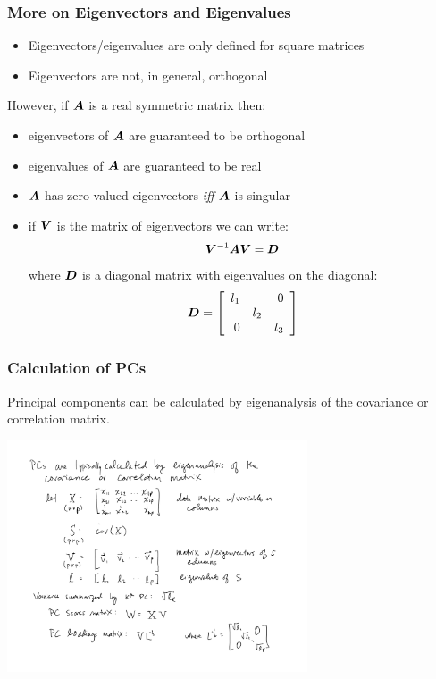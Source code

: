 \documentclass{beamer}
\begin{document}
\begin{frame}
  \frametitle{More on Eigenvectors and Eigenvalues}

\begin{itemize}
 	\item Eigenvectors/eigenvalues are only defined for square matrices
	\item Eigenvectors are not, in general, orthogonal
\end{itemize}
\smallskip

However, if $\bm{A}$ is a real symmetric matrix then:
\begin{itemize}
	\item eigenvectors of $\bm{A}$ are guaranteed to be orthogonal
	\item eigenvalues of $\bm{A}$ are guaranteed to be real
	\item $\bm{A}$ has zero-valued eigenvectors \emph{iff} $\bm{A}$ is singular
	\item if $\bm{V}$ is the matrix of eigenvectors we can write:
\[
	\bm{V}^{-1} \bm{A} \bm{V} = \bm{D}
\]
where $\bm{D}$ is a diagonal matrix with eigenvalues on the diagonal:
\footnotesize{
\[\bm{D} = 
 \left[ \begin{array}{rrr}
l_1 &  & 0 \\
       & l_2 & \\
 0      &        &  l_3\\
\end{array}
\right]
\]
} %

\end{itemize}



\end{frame}

\begin{frame}[fragile]
  \frametitle{Calculation of PCs}

Principal components can be calculated by eigenanalysis of the covariance or correlation matrix.
\medskip


\begin{center}
\includegraphics[height=2.7in]{pca-eigen.pdf}
\end{center}  


\end{frame}
\end{document}
